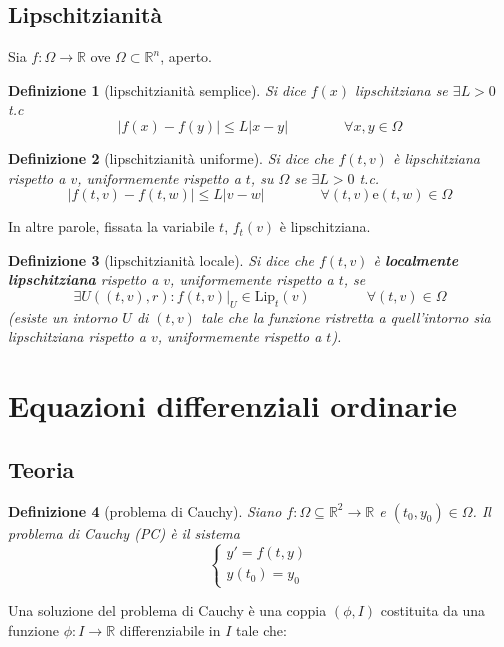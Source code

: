 \documentclass[a4paper,12pt]{article}
\newtheorem{defi}{Definizione}
\begin{document}
\subsection{Lipschitzianità}
Sia $f:\Omega\rightarrow\mathbb{R}$ ove $\Omega\subset\mathbb{R}^n$, aperto.
\begin{defi}[lipschitzianità semplice]
Si dice $f\left(x\right)$ lipschitziana se $\exists L>0$ t.c
$$ |f\left(x\right)- f\left(y\right)| \leq L|x-y|\qquad\qquad\forall x,y \in \Omega $$
\end{defi}

\begin{defi}[lipschitzianità uniforme]
Si dice che $f(t, v)$ è lipschitziana rispetto a $v$, uniformemente rispetto a $t$, su $\Omega$ se $\exists L>0$ t.c.
$$|f(t, v) - f(t, w)| \leq L|v-w|\qquad\qquad\forall (t,v)\text{e} (t, w) \in \Omega$$
\end{defi}
In altre parole, fissata la variabile $t$, $f_t(v)$ è lipschitziana.

\begin{defi}[lipschitzianità locale]
Si dice che $f(t, v)$ è \textbf{localmente lipschitziana} rispetto a $v$, uniformemente rispetto a $t$, se
$$\exists U((t, v), r) : f(t, v)|_U \in \text{Lip}_t(v)\qquad\qquad\forall(t, v)\in \Omega$$
(esiste un intorno $U$ di $(t, v)$ tale che la funzione ristretta a quell'intorno sia lipschitziana rispetto a $v$, uniformemente rispetto a $t$).
\end{defi}

\section{Equazioni differenziali ordinarie}


\subsection{Teoria}

\begin{defi}[problema di Cauchy]
Siano $f:\Omega \subseteq \mathbb{R}^2 \rightarrow \mathbb{R}$ e $ \left(t_0,y_0\right) \in \Omega$. Il problema di Cauchy (PC) è il sistema
$$\label{PC}\begin{cases} y'=f\left(t,y\right) \\ y\left(t_0\right)=y_0 \end{cases}$$
\end{defi}
Una soluzione del problema di Cauchy è una coppia $\left( \phi , I \right)$ costituita da una funzione $\phi: I \rightarrow \mathbb{R}$ differenziabile in $I$ tale che:
\end{document}
